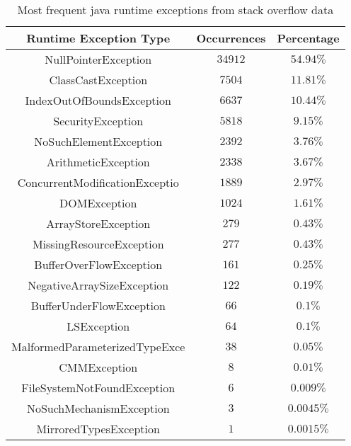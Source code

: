 \begin{table}[h]
\centering
\begin{tabular}{|c|c|c|}
\hline
\textbf{Runtime Exception Type} & \textbf{Occurrences} & \textbf{Percentage}\\
\hline NullPointerException & $34912$ & $54.94\%$ \\ \hline

ClassCastException & $7504$ & $11.81\%$ \\ \hline

IndexOutOfBoundsException & $6637$ & $10.44\%$ \\ \hline

SecurityException  & $5818$ & $9.15\%$ \\  \hline

NoSuchElementException & $2392$ & $3.76\%$ \\ \hline

ArithmeticException & $2338$ & $3.67\%$ \\ \hline

ConcurrentModificationExceptio & $1889$ & $2.97\%$ \\ \hline

DOMException & $1024$ & $1.61\%$ \\ \hline

ArrayStoreException & $279$ & $0.43\%$ \\ \hline

MissingResourceException & $277$ & $0.43\%$ \\ \hline

BufferOverFlowException & $161$ & $0.25\%$ \\ \hline

NegativeArraySizeException & $122$ & $0.19\%$ \\ \hline

BufferUnderFlowException & $66$ & $0.1\%$ \\ \hline

LSException & $64$ &  $0.1\%$ \\ \hline

MalformedParameterizedTypeExce & $38$ & $0.05\%$ \\ \hline

CMMException  & $8$ & $0.01\%$ \\ \hline

FileSystemNotFoundException & $6$ & $0.009\%$ \\ \hline

NoSuchMechanismException & $3$ & $0.0045\%$ \\ \hline

MirroredTypesException & $1$ & $0.0015\%$ \\ \hline

\end{tabular}
\caption{Most frequent java runtime exceptions from stack overflow data}
\label{tab:stackoverlow}
\end{table}


